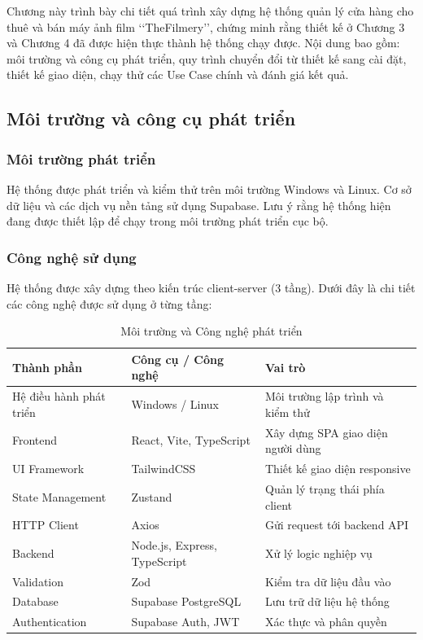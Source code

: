 \setcounter{section}{5}

Chương này trình bày chi tiết quá trình xây dựng hệ thống quản lý cửa hàng cho thuê và bán máy ảnh film \lq\lq TheFilmery\rq\rq, chứng minh rằng thiết kế ở Chương 3 và Chương 4 đã được hiện thực thành hệ thống chạy được. Nội dung bao gồm: môi trường và công cụ phát triển, quy trình chuyển đổi từ thiết kế sang cài đặt, thiết kế giao diện, chạy thử các Use Case chính và đánh giá kết quả.

\subsection{Môi trường và công cụ phát triển}

\subsubsection{Môi trường phát triển}

Hệ thống được phát triển và kiểm thử trên môi trường Windows và Linux. Cơ sở dữ liệu và các dịch vụ nền tảng sử dụng Supabase. Lưu ý rằng hệ thống hiện đang được thiết lập để chạy trong môi trường phát triển cục bộ.

\subsubsection{Công nghệ sử dụng}

Hệ thống được xây dựng theo kiến trúc client-server (3 tầng). Dưới đây là chi tiết các công nghệ được sử dụng ở từng tầng:

\begin{table}[H]
	\centering
	\caption{Môi trường và Công nghệ phát triển}
	\begin{tabularx}{\textwidth}{|l|l|X|}
		\hline
		\textbf{Thành phần} & \textbf{Công cụ / Công nghệ} & \textbf{Vai trò} \\
		\hline
		Hệ điều hành phát triển & Windows / Linux & Môi trường lập trình và kiểm thử \\
		\hline
		Frontend & React, Vite, TypeScript & Xây dựng SPA giao diện người dùng \\
		\hline
		UI Framework & TailwindCSS & Thiết kế giao diện responsive \\
		\hline
		State Management & Zustand & Quản lý trạng thái phía client \\
		\hline
		HTTP Client & Axios & Gửi request tới backend API \\
		\hline
		Backend & Node.js, Express, TypeScript & Xử lý logic nghiệp vụ \\
		\hline
		Validation & Zod & Kiểm tra dữ liệu đầu vào \\
		\hline
		Database & Supabase PostgreSQL & Lưu trữ dữ liệu hệ thống \\
		\hline
		Authentication & Supabase Auth, JWT & Xác thực và phân quyền \\
		\hline
	\end{tabularx}
\end{table}

